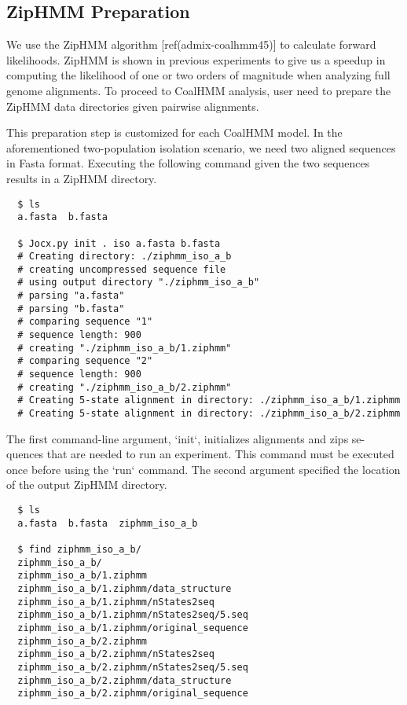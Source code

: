 \subsection{ZipHMM Preparation}

We use the ZipHMM algorithm [ref(admix-coalhmm45)] to calculate forward
likelihoods. ZipHMM is shown in previous experiments to give us a speedup in
computing the likelihood of one or two orders of magnitude when analyzing full
genome alignments. To proceed to CoalHMM analysis, user need to prepare the
ZipHMM data directories given pairwise alignments.

This preparation step is customized for each CoalHMM model. In the
aforementioned two-population isolation scenario, we need two aligned sequences
in Fasta format. Executing the following command given the two sequences results
in a ZipHMM directory.

{\small{}\begin{verbatim}
  $ ls
  a.fasta  b.fasta

  $ Jocx.py init . iso a.fasta b.fasta
  # Creating directory: ./ziphmm_iso_a_b
  # creating uncompressed sequence file
  # using output directory "./ziphmm_iso_a_b"
  # parsing "a.fasta"
  # parsing "b.fasta"
  # comparing sequence "1"
  # sequence length: 900
  # creating "./ziphmm_iso_a_b/1.ziphmm"
  # comparing sequence "2"
  # sequence length: 900
  # creating "./ziphmm_iso_a_b/2.ziphmm"
  # Creating 5-state alignment in directory: ./ziphmm_iso_a_b/1.ziphmm
  # Creating 5-state alignment in directory: ./ziphmm_iso_a_b/2.ziphmm
\end{verbatim}}

The first command-line argument, ‘init‘, initializes alignments and zips se-
quences that are needed to run an experiment. This command must be executed once
before using the ‘run‘ command. The second argument specified the location of
the output ZipHMM directory.

{\small{}\begin{verbatim}
  $ ls
  a.fasta  b.fasta  ziphmm_iso_a_b

  $ find ziphmm_iso_a_b/
  ziphmm_iso_a_b/
  ziphmm_iso_a_b/1.ziphmm
  ziphmm_iso_a_b/1.ziphmm/data_structure
  ziphmm_iso_a_b/1.ziphmm/nStates2seq
  ziphmm_iso_a_b/1.ziphmm/nStates2seq/5.seq
  ziphmm_iso_a_b/1.ziphmm/original_sequence
  ziphmm_iso_a_b/2.ziphmm
  ziphmm_iso_a_b/2.ziphmm/nStates2seq
  ziphmm_iso_a_b/2.ziphmm/nStates2seq/5.seq
  ziphmm_iso_a_b/2.ziphmm/data_structure
  ziphmm_iso_a_b/2.ziphmm/original_sequence
\end{verbatim}}

